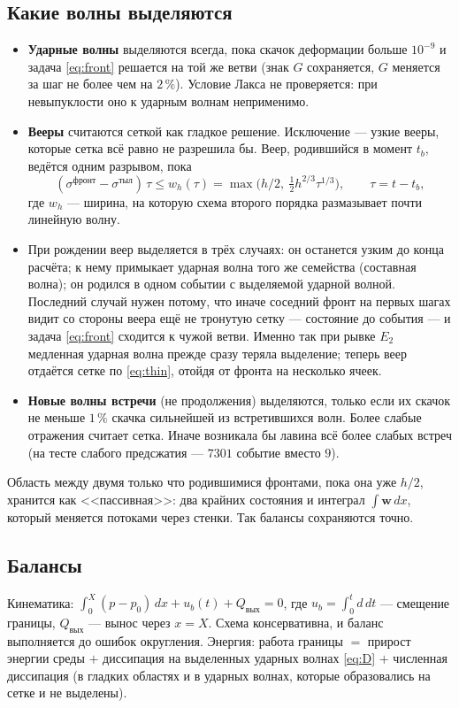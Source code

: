 \documentclass[11pt,a4paper]{article}
\theoremstyle{definition}
\theoremstyle{remark}
\newcommand{\bw}{\mathbf w}
\begin{document}
\subsection{Какие волны выделяются}
\begin{itemize}
\item \textbf{Ударные волны} выделяются всегда, пока скачок деформации больше $10^{-9}$ и задача
\eqref{eq:front} решается на той же ветви (знак $G$ сохраняется, $G$ меняется за шаг не более чем
на $2\,\%$). Условие Лакса не проверяется: при невыпуклости оно к ударным волнам неприменимо.
\item \textbf{Вееры} считаются сеткой как гладкое решение. Исключение --- узкие вееры, которые сетка
всё равно не разрешила бы. Веер, родившийся в момент $t_b$, ведётся одним разрывом, пока
\begin{equation}\label{eq:thin}
(\sigma^{\text{фронт}}-\sigma^{\text{тыл}})\,\tau \le w_h(\tau) = \max\bigl(h/2,\ \tfrac12 h^{2/3}\tau^{1/3}\bigr),\qquad \tau = t-t_b,
\end{equation}
где $w_h$ --- ширина, на которую схема второго порядка размазывает почти линейную волну.
\item При рождении веер выделяется в трёх случаях: он останется узким до конца расчёта; к нему
примыкает ударная волна того же семейства (составная волна); он родился в одном событии с
выделяемой ударной волной. Последний случай нужен потому, что иначе соседний фронт на первых
шагах видит со стороны веера ещё не тронутую сетку --- состояние до события --- и задача
\eqref{eq:front} сходится к чужой ветви. Именно так при рывке $E_2$ медленная ударная волна прежде
сразу теряла выделение; теперь веер отдаётся сетке по \eqref{eq:thin}, отойдя от фронта на
несколько ячеек.
\item \textbf{Новые волны встречи} (не продолжения) выделяются, только если их скачок не меньше
$1\,\%$ скачка сильнейшей из встретившихся волн. Более слабые отражения считает сетка. Иначе
возникала бы лавина всё более слабых встреч (на тесте слабого предсжатия --- $7301$ событие
вместо $9$).
\end{itemize}
Область между двумя только что родившимися фронтами, пока она уже $h/2$, хранится как
<<пассивная>>: два крайних состояния и интеграл $\int\bw\,dx$, который меняется потоками через
стенки. Так балансы сохраняются точно.

\subsection{Балансы}
Кинематика: $\int_0^X (p-p_0)\,dx + u_b(t) + Q_{\text{вых}} = 0$, где $u_b = \int_0^t d\,dt$ ---
смещение границы, $Q_{\text{вых}}$ --- вынос через $x=X$. Схема консервативна, и баланс
выполняется до ошибок округления. Энергия: работа границы $=$ прирост энергии среды $+$ диссипация
на выделенных ударных волнах \eqref{eq:D} $+$ численная диссипация (в гладких областях и в
ударных волнах, которые образовались на сетке и не выделены).
\end{document}
